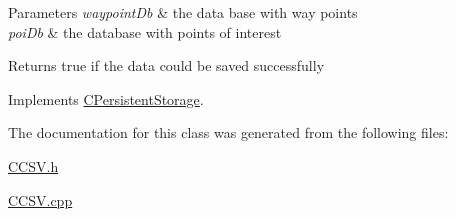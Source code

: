 \begin{DoxyParams}{Parameters}
{\em waypoint\+Db} & the data base with way points \\
\hline
{\em poi\+Db} & the database with points of interest \\
\hline
\end{DoxyParams}
\begin{DoxyReturn}{Returns}
true if the data could be saved successfully 
\end{DoxyReturn}


Implements \hyperlink{classCPersistentStorage_ab0c03dbf674c6218d574289ec54a75ed}{C\+Persistent\+Storage}.



The documentation for this class was generated from the following files\+:\begin{DoxyCompactItemize}
\item 
\hyperlink{CCSV_8h}{C\+C\+S\+V.\+h}\item 
\hyperlink{CCSV_8cpp}{C\+C\+S\+V.\+cpp}\end{DoxyCompactItemize}
